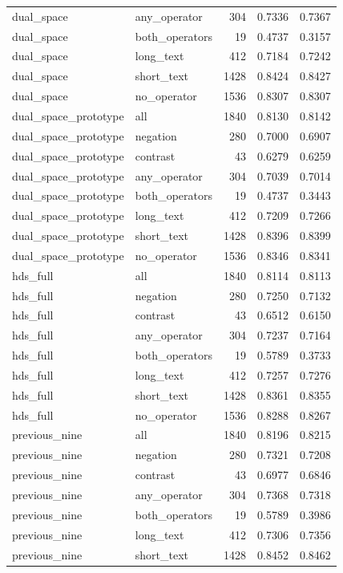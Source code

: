 \begin{tabular}{llrrr}
dual\_space & any\_operator & 304 & 0.7336 & 0.7367 \\
dual\_space & both\_operators & 19 & 0.4737 & 0.3157 \\
dual\_space & long\_text & 412 & 0.7184 & 0.7242 \\
dual\_space & short\_text & 1428 & 0.8424 & 0.8427 \\
dual\_space & no\_operator & 1536 & 0.8307 & 0.8307 \\
dual\_space\_prototype & all & 1840 & 0.8130 & 0.8142 \\
dual\_space\_prototype & negation & 280 & 0.7000 & 0.6907 \\
dual\_space\_prototype & contrast & 43 & 0.6279 & 0.6259 \\
dual\_space\_prototype & any\_operator & 304 & 0.7039 & 0.7014 \\
dual\_space\_prototype & both\_operators & 19 & 0.4737 & 0.3443 \\
dual\_space\_prototype & long\_text & 412 & 0.7209 & 0.7266 \\
dual\_space\_prototype & short\_text & 1428 & 0.8396 & 0.8399 \\
dual\_space\_prototype & no\_operator & 1536 & 0.8346 & 0.8341 \\
hds\_full & all & 1840 & 0.8114 & 0.8113 \\
hds\_full & negation & 280 & 0.7250 & 0.7132 \\
hds\_full & contrast & 43 & 0.6512 & 0.6150 \\
hds\_full & any\_operator & 304 & 0.7237 & 0.7164 \\
hds\_full & both\_operators & 19 & 0.5789 & 0.3733 \\
hds\_full & long\_text & 412 & 0.7257 & 0.7276 \\
hds\_full & short\_text & 1428 & 0.8361 & 0.8355 \\
hds\_full & no\_operator & 1536 & 0.8288 & 0.8267 \\
previous\_nine & all & 1840 & 0.8196 & 0.8215 \\
previous\_nine & negation & 280 & 0.7321 & 0.7208 \\
previous\_nine & contrast & 43 & 0.6977 & 0.6846 \\
previous\_nine & any\_operator & 304 & 0.7368 & 0.7318 \\
previous\_nine & both\_operators & 19 & 0.5789 & 0.3986 \\
previous\_nine & long\_text & 412 & 0.7306 & 0.7356 \\
previous\_nine & short\_text & 1428 & 0.8452 & 0.8462 \\

\end{tabular}
